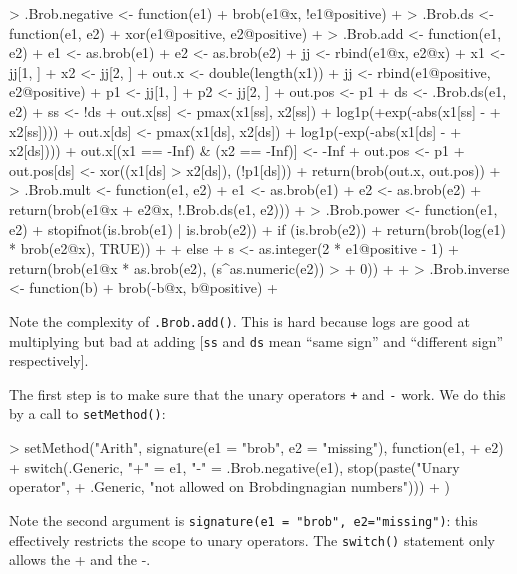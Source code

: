 \documentclass[a4paper]{article}
\begin{document}
\begin{Schunk}
\begin{Sinput}
> .Brob.negative <- function(e1) {
+     brob(e1@x, !e1@positive)
+ }
> .Brob.ds <- function(e1, e2) {
+     xor(e1@positive, e2@positive)
+ }
> .Brob.add <- function(e1, e2) {
+     e1 <- as.brob(e1)
+     e2 <- as.brob(e2)
+     jj <- rbind(e1@x, e2@x)
+     x1 <- jj[1, ]
+     x2 <- jj[2, ]
+     out.x <- double(length(x1))
+     jj <- rbind(e1@positive, e2@positive)
+     p1 <- jj[1, ]
+     p2 <- jj[2, ]
+     out.pos <- p1
+     ds <- .Brob.ds(e1, e2)
+     ss <- !ds
+     out.x[ss] <- pmax(x1[ss], x2[ss]) + log1p(+exp(-abs(x1[ss] - 
+         x2[ss])))
+     out.x[ds] <- pmax(x1[ds], x2[ds]) + log1p(-exp(-abs(x1[ds] - 
+         x2[ds])))
+     out.x[(x1 == -Inf) & (x2 == -Inf)] <- -Inf
+     out.pos <- p1
+     out.pos[ds] <- xor((x1[ds] > x2[ds]), (!p1[ds]))
+     return(brob(out.x, out.pos))
+ }
> .Brob.mult <- function(e1, e2) {
+     e1 <- as.brob(e1)
+     e2 <- as.brob(e2)
+     return(brob(e1@x + e2@x, !.Brob.ds(e1, e2)))
+ }
> .Brob.power <- function(e1, e2) {
+     stopifnot(is.brob(e1) | is.brob(e2))
+     if (is.brob(e2)) {
+         return(brob(log(e1) * brob(e2@x), TRUE))
+     }
+     else {
+         s <- as.integer(2 * e1@positive - 1)
+         return(brob(e1@x * as.brob(e2), (s^as.numeric(e2)) > 
+             0))
+     }
+ }
> .Brob.inverse <- function(b) {
+     brob(-b@x, b@positive)
+ }
\end{Sinput}
\end{Schunk}

Note the complexity of {\tt .Brob.add()}.  This is hard because logs
are good at multiplying but bad at adding [{\tt ss} and {\tt ds} mean
``same sign'' and ``different sign'' respectively].

The first step is to make sure that the unary operators {\tt +} and
{\tt -} work.  We do this by a call to {\tt setMethod()}:


\begin{Schunk}
\begin{Sinput}
> setMethod("Arith", signature(e1 = "brob", e2 = "missing"), function(e1, 
+     e2) {
+     switch(.Generic, "+" = e1, "-" = .Brob.negative(e1), stop(paste("Unary operator", 
+         .Generic, "not allowed on Brobdingnagian numbers")))
+ })
\end{Sinput}
\end{Schunk}

Note the second argument is {\tt signature(e1 = "brob",
 e2="missing")}: this effectively restricts the scope to unary
 operators.  The {\tt switch()} statement only allows the + and the -.\
\end{document}
